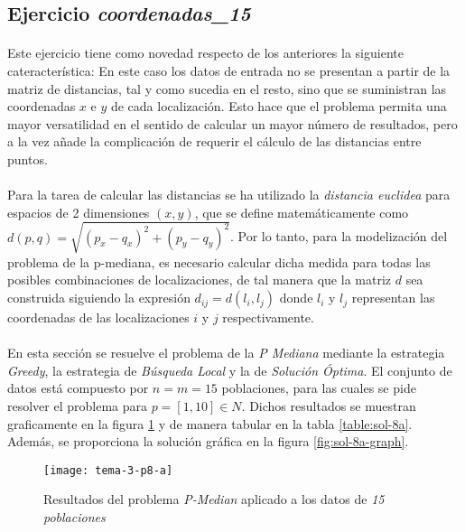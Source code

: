 \documentclass[spanish]{article}
\begin{document}
		\subsection{Ejercicio \emph{coordenadas\_15}}
		\label{sec:e-8a}

			\paragraph{}
			Este ejercicio tiene como novedad respecto de los anteriores la siguiente cateracterística: En este caso los datos de entrada no se presentan a partir de la matriz de distancias, tal y como sucedia en el resto, sino que se suministran las coordenadas $x$ e $y$ de cada localización. Esto hace que el problema permita una mayor versatilidad en el sentido de calcular un mayor número de resultados, pero a la vez añade la complicación de requerir el cálculo de las distancias entre puntos.

			\paragraph{}
			Para la tarea de calcular las distancias se ha utilizado la \emph{distancia euclidea} para espacios de 2 dimensiones $(x,y)$, que se define matemáticamente como $d(p, q) = \sqrt{(p_x - q_x)^2 + (p_y - q_y)^2}$. Por lo tanto, para la modelización del problema de la p-mediana, es necesario calcular dicha medida para todas las posibles combinaciones de localizaciones, de tal manera que la matriz $d$ sea construida siguiendo la expresión $d_{ij} = d(l_i, l_j)$ donde $l_i$ y $l_j$ representan las coordenadas de las localizaciones $i$ y $j$ respectivamente.


			\paragraph{}
			En esta sección se resuelve el problema de la \emph{P Mediana} mediante la estrategia \emph{Greedy}, la estrategia de \emph{Búsqueda Local} y la de \emph{Solución Óptima}. El conjunto de datos está compuesto por $n = m = 15$ poblaciones, para las cuales se pide resolver el problema para $p = [1,10] \in N$. Dichos resultados se muestran graficamente en la figura \ref{fig:sol-8a} y de manera tabular en la tabla \ref{table:sol-8a}. Además, se proporciona la solución gráfica en la figura \ref{fig:sol-8a-graph}.

			\begin{figure}[h]
				\begin{center}
					\texttt{[image: tema-3-p8-a]}
				\end{center}
				\caption{Resultados del problema \emph{P-Median} aplicado a los datos de \emph{15 poblaciones}}
				\label{fig:sol-8a}
			\end{figure}
\end{document}
